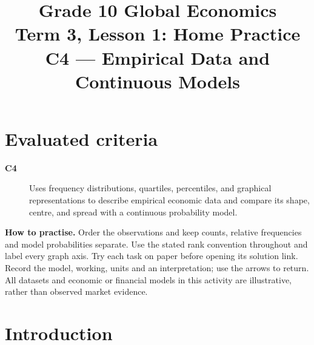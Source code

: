 \makeatletter
{}
\makeatother




\title{Grade 10 Global Economics\\Term 3, Lesson 1: Home Practice\\C4 --- Empirical Data and Continuous Models}
\author{}
\date{}

\maketitle
\setcounter{tocdepth}{1}
\setcounter{secnumdepth}{2}
\label{toc}
\tableofcontents
\section*{Evaluated criteria}
\begin{description}
\item[\textbf{C4}] Uses frequency distributions, quartiles, percentiles, and graphical representations to describe empirical economic data and compare its shape, centre, and spread with a continuous probability model.
\end{description}
\textbf{How to practise.} Order the observations and keep counts, relative frequencies and model probabilities separate. Use the stated rank convention throughout and label every graph axis. Try each task on paper before opening its solution link. Record the model, working, units and an interpretation; use the arrows to return.
All datasets and economic or financial models in this activity are illustrative, rather than observed market evidence.

\clearpage
\section{Introduction}\label{sec:introduction}
